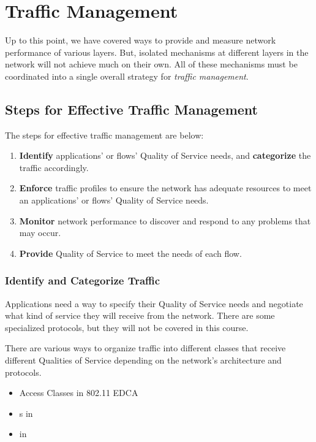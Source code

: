 \section{Traffic Management}\label{sec:Traffic_Management}
Up to this point, we have covered ways to provide and measure network performance of various layers.
But, isolated mechanisms at different layers in the network will not achieve much on their own.
All of these mechanisms must be coordinated into a single overall strategy for \emph{traffic management}.

\subsection{Steps for Effective Traffic Management}\label{subsec:Steps_Effective_Traffic_Management}
The steps for effective traffic management are below:
\begin{enumerate}[noitemsep]
\item \textbf{Identify} applications' or flows' Quality of Service needs, and \textbf{categorize} the traffic accordingly.
\item \textbf{Enforce} traffic profiles to ensure the network has adequate resources to meet an applications' or flows' Quality of Service needs.
\item \textbf{Monitor} network performance to discover and respond to any problems that may occur.
\item \textbf{Provide} Quality of Service to meet the needs of each flow.
\end{enumerate}

\subsubsection{Identify and Categorize Traffic}\label{subsubsec:Identify_Categorize_Traffic}
Applications need a way to specify their Quality of Service needs and negotiate what kind of service they will receive from the network.
There are some specialized protocols, but they will not be covered in this course.

There are various ways to organize traffic into different classes that receive different Qualities of Service depending on the network's architecture and protocols.
\begin{itemize}[noitemsep]
\item Access Classes in 802.11 EDCA
\item {}s in 
\item {} in 
\end{itemize}

